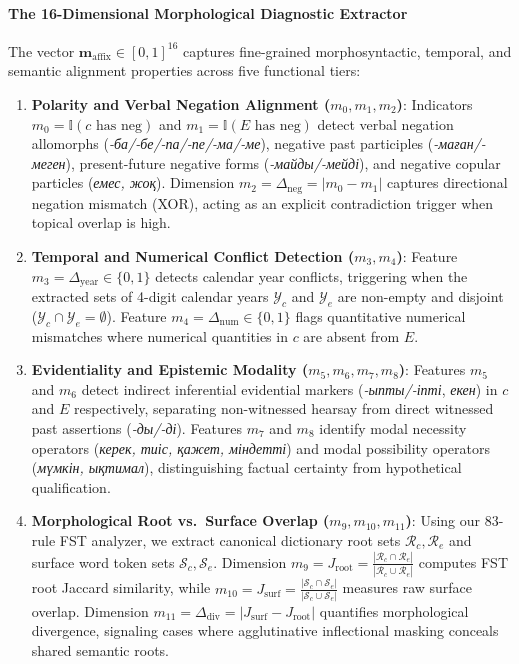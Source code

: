 \paragraph{The 16-Dimensional Morphological Diagnostic Extractor}
The vector $\mathbf{m}_{\text{affix}} \in [0, 1]^{16}$ captures fine-grained morphosyntactic, temporal, and semantic alignment properties across five functional tiers:
\begin{enumerate}
    \item \textbf{Polarity and Verbal Negation Alignment ($m_0, m_1, m_2$)}: Indicators $m_0 = \mathbb{I}(c \text{ has neg})$ and $m_1 = \mathbb{I}(E \text{ has neg})$ detect verbal negation allomorphs (\textit{-ба/-бе/-па/-пе/-ма/-ме}), negative past participles (\textit{-маған/-меген}), present-future negative forms (\textit{-майды/-мейді}), and negative copular particles (\textit{емес, жоқ}). Dimension $m_2 = \Delta_{\text{neg}} = |m_0 - m_1|$ captures directional negation mismatch (XOR), acting as an explicit contradiction trigger when topical overlap is high.
    \item \textbf{Temporal and Numerical Conflict Detection ($m_3, m_4$)}: Feature $m_3 = \Delta_{\text{year}} \in \{0, 1\}$ detects calendar year conflicts, triggering when the extracted sets of 4-digit calendar years $\mathcal{Y}_c$ and $\mathcal{Y}_e$ are non-empty and disjoint ($\mathcal{Y}_c \cap \mathcal{Y}_e = \emptyset$). Feature $m_4 = \Delta_{\text{num}} \in \{0, 1\}$ flags quantitative numerical mismatches where numerical quantities in $c$ are absent from $E$.
    \item \textbf{Evidentiality and Epistemic Modality ($m_5, m_6, m_7, m_8$)}: Features $m_5$ and $m_6$ detect indirect inferential evidential markers (\textit{-ыпты/-іпті}, \textit{екен}) in $c$ and $E$ respectively, separating non-witnessed hearsay from direct witnessed past assertions (\textit{-ды/-ді}). Features $m_7$ and $m_8$ identify modal necessity operators (\textit{керек, тиіс, қажет, міндетті}) and modal possibility operators (\textit{мүмкін, ықтимал}), distinguishing factual certainty from hypothetical qualification.
    \item \textbf{Morphological Root vs.\ Surface Overlap ($m_9, m_{10}, m_{11}$)}: Using our 83-rule FST analyzer, we extract canonical dictionary root sets $\mathcal{R}_c, \mathcal{R}_e$ and surface word token sets $\mathcal{S}_c, \mathcal{S}_e$. Dimension $m_9 = J_{\text{root}} = \frac{|\mathcal{R}_c \cap \mathcal{R}_e|}{|\mathcal{R}_c \cup \mathcal{R}_e|}$ computes FST root Jaccard similarity, while $m_{10} = J_{\text{surf}} = \frac{|\mathcal{S}_c \cap \mathcal{S}_e|}{|\mathcal{S}_c \cup \mathcal{S}_e|}$ measures raw surface overlap. Dimension $m_{11} = \Delta_{\text{div}} = |J_{\text{surf}} - J_{\text{root}}|$ quantifies morphological divergence, signaling cases where agglutinative inflectional masking conceals shared semantic roots.

\end{enumerate}
